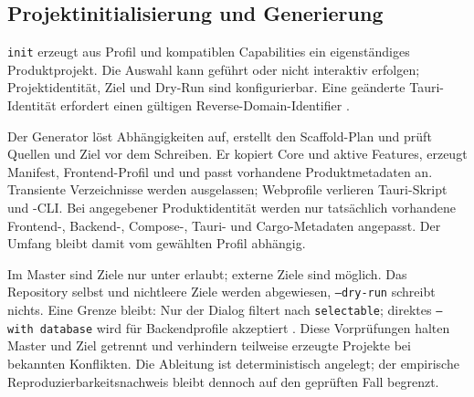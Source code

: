 \subsection{Projektinitialisierung und Generierung}
\label{subsec:projektinitialisierung-generierung}

\texttt{init} erzeugt aus Profil und kompatiblen Capabilities ein eigenständiges
Produktprojekt. Die Auswahl kann geführt oder nicht interaktiv erfolgen;
Projektidentität, Ziel und Dry-Run sind konfigurierbar. Eine geänderte
Tauri-Identität erfordert einen gültigen Reverse-Domain-Identifier
\parencite{kleiveist2026profiles,kleiveist2026tooling}.



Der Generator löst Abhängigkeiten auf, erstellt den Scaffold-Plan und prüft
Quellen und Ziel vor dem Schreiben. Er kopiert Core und aktive Features,
erzeugt Manifest, Frontend-Profil und  und passt vorhandene
Produktmetadaten an. Transiente Verzeichnisse werden ausgelassen; Webprofile
verlieren Tauri-Skript und -CLI.
Bei angegebener Produktidentität werden nur tatsächlich vorhandene Frontend-,
Backend-, Compose-, Tauri- und Cargo-Metadaten angepasst. Der Umfang bleibt
damit vom gewählten Profil abhängig.

Im Master sind Ziele nur unter  erlaubt; externe Ziele sind
möglich. Das Repository selbst und nichtleere Ziele werden abgewiesen,
\texttt{--dry-run} schreibt nichts. Eine Grenze bleibt: Nur der Dialog filtert
nach \texttt{selectable}; direktes \texttt{--with database} wird für
Backendprofile akzeptiert \parencite{kleiveist2026governance-snapshot}.
Diese Vorprüfungen halten Master und Ziel getrennt und verhindern teilweise
erzeugte Projekte bei bekannten Konflikten. Die Ableitung ist deterministisch
angelegt; der empirische Reproduzierbarkeitsnachweis bleibt dennoch auf den
geprüften Fall begrenzt.
